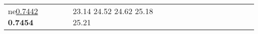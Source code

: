 \documentclass[runningheads]{llncs}
\begin{document}
\begin{table}[!ht]
\begin{tabular}{|p{7em}|p{2.5em}|p{2.5em}|p{3em}|p{2.5em}|p{3em}|p{2.5em}|p{3em}|p{2.5em}|p{3em}|p{2.5em}|p{3em}|}
ne{}\underline{0.7442} \newline{}\bfseries{0.7454} & 23.14 \newline{}24.52 \newline{}24.62 \newline{}25.18 \newline{}25.21
\end{tabular}
\end{table}
\end{document}
